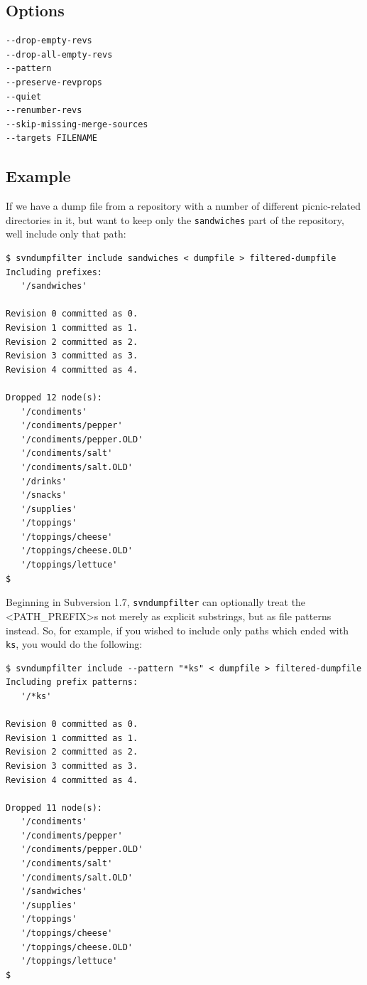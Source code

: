 \subsection{Options}

\begin{verbatim}
--drop-empty-revs
--drop-all-empty-revs
--pattern
--preserve-revprops
--quiet
--renumber-revs
--skip-missing-merge-sources
--targets FILENAME
\end{verbatim}

\subsection{Example}

If we have a dump file from a repository with a number of different
picnic-related directories in it, but want to keep only the
\texttt{sandwiches} part of the repository, we\textquotesingle ll
include only that path:

\begin{verbatim}
$ svndumpfilter include sandwiches < dumpfile > filtered-dumpfile
Including prefixes:
   '/sandwiches'

Revision 0 committed as 0.
Revision 1 committed as 1.
Revision 2 committed as 2.
Revision 3 committed as 3.
Revision 4 committed as 4.

Dropped 12 node(s):
   '/condiments'
   '/condiments/pepper'
   '/condiments/pepper.OLD'
   '/condiments/salt'
   '/condiments/salt.OLD'
   '/drinks'
   '/snacks'
   '/supplies'
   '/toppings'
   '/toppings/cheese'
   '/toppings/cheese.OLD'
   '/toppings/lettuce'
$
\end{verbatim}

Beginning in Subversion 1.7, \texttt{svndumpfilter} can optionally treat
the \textless PATH\_PREFIX\textgreater s not merely as explicit
substrings, but as file patterns instead. So, for example, if you wished
to include only paths which ended with \texttt{ks}, you would do the
following:

\begin{verbatim}
$ svndumpfilter include --pattern "*ks" < dumpfile > filtered-dumpfile
Including prefix patterns:
   '/*ks'

Revision 0 committed as 0.
Revision 1 committed as 1.
Revision 2 committed as 2.
Revision 3 committed as 3.
Revision 4 committed as 4.

Dropped 11 node(s):
   '/condiments'
   '/condiments/pepper'
   '/condiments/pepper.OLD'
   '/condiments/salt'
   '/condiments/salt.OLD'
   '/sandwiches'
   '/supplies'
   '/toppings'
   '/toppings/cheese'
   '/toppings/cheese.OLD'
   '/toppings/lettuce'
$
\end{verbatim}

